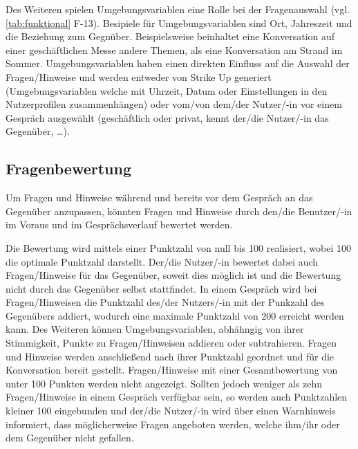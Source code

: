 Des Weiteren spielen Umgebungsvariablen eine Rolle bei der Fragenauswahl (vgl. \ref{tab:funktional} F-13). Besipiele für Umgebungsvariablen sind Ort, Jahreszeit und die Beziehung zum
Gegnüber. Beispielsweise beinhaltet eine Konversation auf einer geschäftlichen Messe andere Themen, als eine Konversation am Strand im Sommer. \newline
Umgebungsvariablen haben einen direkten Einfluss auf die Auswahl der Fragen/Hinweise und werden entweder von Strike Up generiert (Umgebungsvariablen welche mit Uhrzeit, Datum oder Einstellungen
in den Nutzerprofilen zusammenhängen) oder vom/von dem/der Nutzer/-in vor einem Gespräch ausgewählt (geschäftlich oder privat, kennt der/die Nutzer/-in das Gegenüber, \dots).

\subsection{Fragenbewertung}
\label{subsec:fragenbewertung}

Um Fragen und Hinweise während und bereits vor dem Gespräch an das Gegenüber anzupassen, könnten Fragen und Hinweise durch den/die Benutzer/-in im Voraus und im Gesprächsverlauf
bewertet werden.

Die Bewertung wird mittels einer Punktzahl von null bis 100 realisiert, wobei 100 die optimale Punktzahl darstellt. Der/die Nutzer/-in bewertet dabei auch Fragen/Hinweise für das
Gegenüber, soweit dies möglich ist und die Bewertung nicht durch das Gegenüber selbst stattfindet. In einem Gespräch wird bei Fragen/Hinweisen die Punktzahl des/der Nutzers/-in mit
der Punkzahl des Gegenübers addiert, wodurch eine maximale Punktzahl von 200 erreicht werden kann. Des Weiteren können Umgebungsvariablen, abhähngig von ihrer Stimmigkeit,
Punkte zu Fragen/Hinweisen addieren oder subtrahieren. \newline
Fragen und Hinweise werden anschließend nach ihrer Punktzahl geordnet und für die Konversation bereit gestellt. Fragen/Hinweise mit einer Gesamtbewertung von unter 100 Punkten werden nicht
angezeigt. Sollten jedoch weniger als zehn Fragen/Hinweise in einem Gespräch verfügbar sein, so werden auch Punktzahlen kleiner 100 eingebunden und der/die Nutzer/-in wird über einen
Warnhinweis informiert, dass möglicherweise Fragen angeboten werden, welche ihm/ihr oder dem Gegenüber nicht gefallen.

